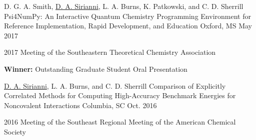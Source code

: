 \begin{cventries}

  \cventry
    {D. G. A. Smith, \underline{D. A. Sirianni}, L. A. Burns, K. Patkowski, and C. D. Sherrill} %
    {{\sc Psi4NumPy}: An Interactive Quantum Chemistry Programming Environment for
    Reference Implementation, Rapid Development, and Education} %
    {Oxford, MS} %
    {May 2017} %
    {%
    \begin{cvitems}
    \item[] 2017 Meeting of the Southeastern Theoretical Chemistry Association %
    \item[] {\bf Winner:} Outstanding Graduate Student Oral Presentation %
    \end{cvitems}
    }


  \cventry
    {\underline{D. A. Sirianni}, L. A. Burns, and C. D. Sherrill} %
    {Comparison of Explicitly Correlated Methods for Computing High-Accuracy 
    Benchmark Energies for Noncovalent Interactions} %
    {Columbia, SC} %
    {Oct. 2016} %
    {%
    \begin{cvitems}
    \item[] 2016 Meeting of the Southeast Regional Meeting of the American Chemical Society %
    \end{cvitems}
    }

\end{cventries}


